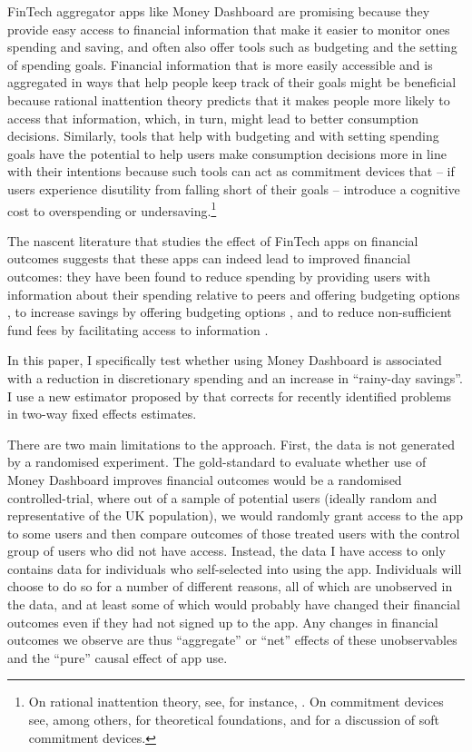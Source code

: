 FinTech aggregator apps like Money Dashboard are promising because they provide
easy access to financial information that make it easier to monitor ones
spending and saving, and often also offer tools such as budgeting and the
setting of spending goals. Financial information that
is more easily accessible and is aggregated in ways that help people keep track
of their goals might be beneficial because rational inattention theory predicts
that it makes people more likely to access that information, which, in turn,
might lead to better consumption decisions. Similarly, tools that help with
budgeting and with setting spending goals have the potential to help users make
consumption decisions more in line with their intentions because such tools can
act as commitment devices that -- if users experience disutility from falling
short of their goals -- introduce a cognitive cost to overspending or
undersaving.\footnote{On rational inattention theory, see, for instance,
    \citet{brunnermeier2008wealth, dellavigna2009psychology,
    sims2003implications}. On commitment devices see, among others,
    \citet{thaler1981economic, laibson1997golden, o1999doing} for theoretical
    foundations, and \citet{beshears2016beyond, hsiaw2013goal} for a discussion
of soft commitment devices.}

The nascent literature that studies the effect of FinTech apps on financial
outcomes suggests that these apps can indeed lead to improved financial
outcomes: they have been found to reduce spending by providing users with
information about their spending relative to peers
\citep{dacunto2020crowdsourcing} and offering budgeting options
\citep{lukas2022influence}, to increase savings by offering budgeting options
\citep{gargano2021goal}, and to reduce non-sufficient fund fees by facilitating
access to information \citep{carlin2022mobile}.

In this paper, I specifically test whether using Money Dashboard is associated
with a reduction in discretionary spending and an increase in ``rainy-day
savings''. I use a new estimator proposed by \citet{callaway2021difference}
that corrects for recently identified problems in two-way fixed effects
estimates.


There are two main limitations to the approach. First, the data is not
generated by a randomised experiment. The gold-standard to evaluate whether use
of Money Dashboard improves financial outcomes would be a randomised
controlled-trial, where out of a sample of potential users (ideally random and
representative of the UK population), we would randomly grant access to the app
to some users and then compare outcomes of those treated users with the control
group of users who did not have access. Instead, the data I have access to
only contains data for individuals who self-selected into using the app.
Individuals will choose to do so for a number of different reasons, all of
which are unobserved in the data, and at least some of which would probably
have changed their financial outcomes even if they had not signed up to the
app. Any changes in financial outcomes we observe are thus ``aggregate'' or
``net'' effects of these unobservables and the ``pure'' causal effect of app
use.

